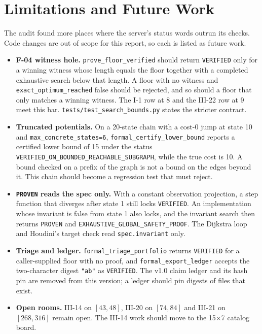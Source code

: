 \documentclass[11pt,a4paper]{article}
\begin{document}
\section{Limitations and Future Work}
\label{sec:limits}

The audit found more places where the server's status words outrun its checks. Code changes are out of scope for this report, so each is listed as future work.
\begin{itemize}
  \item \textbf{F-04 witness hole.} \texttt{prove\_floor\_verified} should return \texttt{VERIFIED} only for a winning witness whose length equals the floor together with a completed exhaustive search below that length. A floor with no witness and \texttt{exact\_optimum\_reached} false should be rejected, and so should a floor that only matches a winning witness. The I-1 row at 8 and the III-22 row at 9 meet this bar. \texttt{tests/test\_search\_bounds.py} states the stricter contract.
  \item \textbf{Truncated potentials.} On a 20-state chain with a cost-0 jump at state 10 and \texttt{max\_\allowbreak concrete\_\allowbreak states=6}, \texttt{formal\_\allowbreak certify\_\allowbreak lower\_\allowbreak bound} reports a certified lower bound of 15 under the status \texttt{VERIFIED\_\allowbreak ON\_\allowbreak BOUNDED\_\allowbreak REACHABLE\_\allowbreak SUBGRAPH}, while the true cost is 10. A bound checked on a prefix of the graph is not a bound on the edges beyond it. This chain should become a regression test that must reject.
  \item \textbf{\texttt{PROVEN} reads the spec only.} With a constant observation projection, a step function that diverges after state 1 still locks \texttt{VERIFIED}. An implementation whose invariant is false from state 1 also locks, and the invariant search then returns \texttt{PROVEN} and \texttt{EXHAUSTIVE\_\allowbreak GLOBAL\_\allowbreak SAFETY\_\allowbreak PROOF}. The Dijkstra loop and Houdini's target check read \texttt{spec.invariant} only.
  \item \textbf{Triage and ledger.} \texttt{formal\_triage\_portfolio} returns \texttt{VERIFIED} for a caller-supplied floor with no proof, and \texttt{formal\_export\_ledger} accepts the two-character digest \texttt{"ab"} as \texttt{VERIFIED}. The v1.0 claim ledger and its hash pin are removed from this version; a ledger should pin digests of files that exist.
  \item \textbf{Open rooms.} III-14 on $[43,48]$, III-20 on $[74,84]$ and III-21 on $[268,316]$ remain open. The III-14 work should move to the 15$\times$7 catalog board.
\end{itemize}
\end{document}
